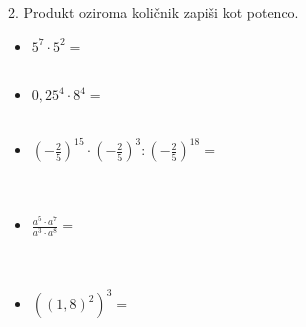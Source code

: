         \begin{frame}[t]
            \begin{alertblock}{2. Produkt oziroma količnik zapiši kot potenco.}
                \begin{itemize}
                    \item $5^7\cdot 5^2=$ \\ ~ \\ 
                    \item $0,25^4\cdot 8^4=$ \\ ~ \\ 
                    \item $\left(-\frac{2}{5}\right)^{15}\cdot\left(-\frac{2}{5}\right)^3:\left(-\frac{2}{5}\right)^{18}=$ \\ ~ \\ ~ \\
                    \item $\frac{a^5\cdot a^7}{a^3\cdot a^8}=$ \\ ~ \\ ~ \\
                    \item $\left(\left(1,8\right)^2\right)^3=$ \\ ~ \\ 
                \end{itemize}
            \end{alertblock}
        \end{frame}

